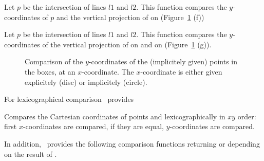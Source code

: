      {Let $p$ be the intersection of lines $l1$ and $l2$.
       This function compares the $y$-coordinates of $p$ and 
       the vertical projection of  on 
	 (Figure~\ref{fig-compare2} (f))}


{Let $p$ be the intersection of lines $l1$ and $l2$. This function 
 compares the $y$-coordinates of the vertical projection of  on 
  and on  (Figure~\ref{fig-compare2} (g)).}

\begin{figure}[h]
\centerline{}
\caption{Comparison of the $y$-coordinates of the (implicitely given)
         points in the boxes, at an $x$-coordinate. The $x$-coordinate
         is either given explicitely (disc) or implicitely (circle).
	 \label{fig-compare2}}
\end{figure} 


For lexicographical comparison \cgal\ provides

      {Compares the Cartesian coordinates of points  and
        lexicographically in $xy$ order: first 
       $x$-coordinates are compared, if they are equal, $y$-coordinates
       are compared.}

In addition, \cgal\ provides the following comparison functions
returning  or  depending on the result
of .

 {}

 {}

 {}

 {}
